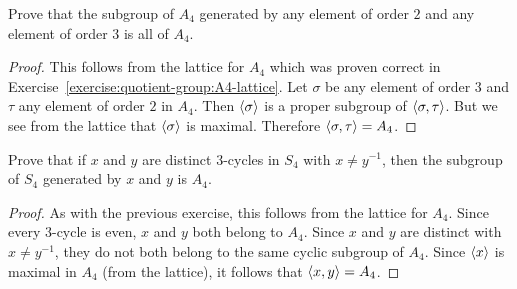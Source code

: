  Prove that the subgroup of $A_4$ generated by any
element of order $2$ and any element of order $3$ is all of $A_4$.
\begin{proof}
  This follows from the lattice for $A_4$ which was proven correct in
  Exercise~\ref{exercise:quotient-group:A4-lattice}. Let $\sigma$ be
  any element of order $3$ and $\tau$ any element of order $2$ in
  $A_4$. Then $\langle{\sigma}\rangle$ is a proper subgroup of
  $\langle{\sigma,\tau}\rangle$. But we see from the lattice that $\langle{\sigma}\rangle$
  is maximal. Therefore $\langle{\sigma,\tau}\rangle = A_4$.
\end{proof}

\label{exercise:quotient-group:3-cycles-generate-A4}
Prove that if $x$ and $y$ are distinct $3$-cycles in $S_4$ with
$x\neq y^{-1}$, then the subgroup of $S_4$ generated by $x$ and $y$ is
$A_4$.
\begin{proof}
  As with the previous exercise, this follows from the lattice for
  $A_4$. Since every $3$-cycle is even, $x$ and $y$ both belong to
  $A_4$. Since $x$ and $y$ are distinct with $x\neq y^{-1}$, they do
  not both belong to the same cyclic subgroup of $A_4$. Since
  $\langle{x}\rangle$ is maximal in $A_4$ (from the lattice), it follows that
  $\langle{x,y}\rangle = A_4$.
\end{proof}

